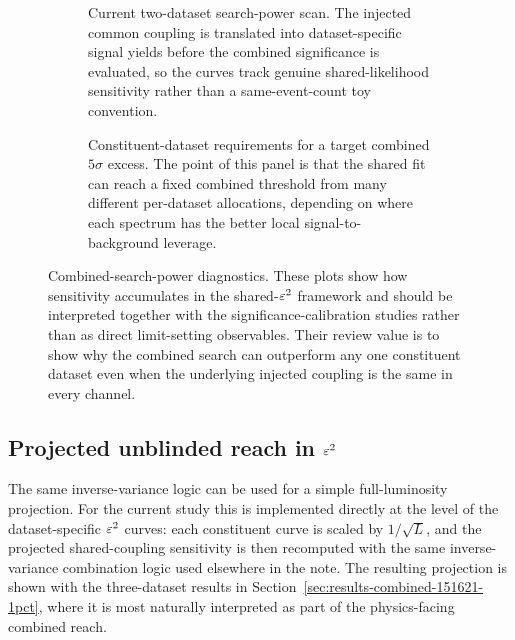 \begin{figure}[H]
\centering
\begin{subfigure}[t]{0.66\linewidth}
  \centering
  \caption{Current two-dataset search-power scan. The injected common coupling is
  translated into dataset-specific signal yields before the combined significance is
  evaluated, so the curves track genuine shared-likelihood sensitivity rather than a
  same-event-count toy convention.}
\end{subfigure}

\vspace{0.25em}

\begin{subfigure}[t]{0.66\linewidth}
  \centering
  \caption{Constituent-dataset requirements for a target combined $5\sigma$ excess. The
  point of this panel is that the shared fit can reach a fixed combined threshold from
  many different per-dataset allocations, depending on where each spectrum has the
  better local signal-to-background leverage.}
\end{subfigure}
\caption{Combined-search-power diagnostics. These plots show how sensitivity accumulates
in the shared-$\varepsilon^2$ framework and should be interpreted together with the
significance-calibration studies rather than as direct limit-setting observables. Their
review value is to show why the combined search can outperform any one constituent
dataset even when the underlying injected coupling is the same in every channel.}
\label{fig:combined-search-power}
\end{figure}

\subsection{Projected unblinded reach in \texorpdfstring{$\varepsilon^2$}{epsilon2}}

The same inverse-variance logic can be used for a simple full-luminosity projection.
For the current study this is implemented directly at the level of the dataset-specific
$\varepsilon^2$ curves: each constituent curve is scaled by $1/\sqrt{L}$, and the projected
shared-coupling sensitivity is then recomputed with the same inverse-variance
combination logic used elsewhere in the note. The resulting projection is shown with
the three-dataset results in Section~\ref{sec:results-combined-151621-1pct}, where it
is most naturally interpreted as part of the physics-facing combined reach.

